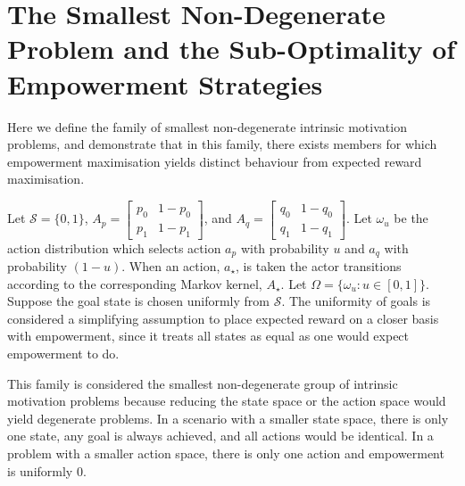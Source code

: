 \documentclass{article}
\newcommand{\Ss}{\mathcal{S}}
\begin{document}
\section{The Smallest Non-Degenerate Problem and the Sub-Optimality of Empowerment Strategies}
Here we define the family of smallest non-degenerate intrinsic motivation problems, and demonstrate that in this family, there exists members for which empowerment maximisation yields distinct behaviour from expected reward maximisation.

Let $\Ss=\{0,1\}$, $A_p=\left[\begin{matrix} p_0 & 1-p_0 \\ p_1 & 1-p_1\end{matrix}\right]$, and $A_q=\left[\begin{matrix} q_0 & 1-q_0 \\ q_1 & 1-q_1\end{matrix}\right]$. Let $\omega_u$ be the action distribution which selects action $a_p$ with probability $u$ and $a_q$ with probability $(1-u)$. When an action, $a_\star$, is taken the actor transitions according to the corresponding Markov kernel, $A_\star$. Let $\Omega=\{\omega_u:u\in[0,1]\}$. Suppose the goal state is chosen uniformly from $\Ss$. The uniformity of goals is considered a simplifying assumption to place expected reward on a closer basis with empowerment, since it treats all states as equal as one would expect empowerment to do.

This family is considered the smallest non-degenerate group of intrinsic motivation problems because reducing the state space or the action space would yield degenerate problems. In a scenario with a smaller state space, there is only one state, any goal is always achieved, and all actions would be identical. In a problem with a smaller action space, there is only one action and empowerment is uniformly $0$.
\end{document}
